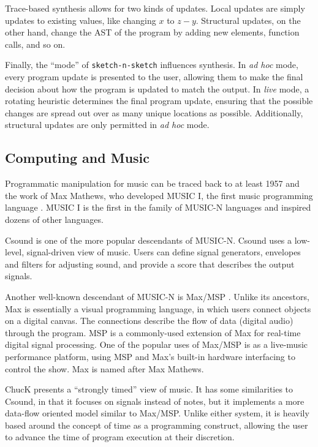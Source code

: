 \documentclass[nocopyrightspace,numbers,10pt]{sigplanconf}
\newcommand{\sketch}{\texttt{sketch-n-sketch}}
\begin{document}
Trace-based synthesis allows for two kinds of updates. Local updates are simply
updates to existing values, like changing $x$ to $z - y$. Structural updates, on
the other hand, change the AST of the program by adding new elements, function
calls, and so on.

Finally, the ``mode'' of \sketch{} influences synthesis. In \emph{ad hoc} mode,
every program update is presented to the user, allowing them to make the final
decision about how the program is updated to match the output. In \emph{live}
mode, a rotating heuristic determines the final program update, ensuring that
the possible changes are spread out over as many unique locations as possible.
Additionally, structural updates are only permitted in \emph{ad hoc} mode.

\subsection{Computing and Music}
\label{sub:background:music}

Programmatic manipulation for music can be traced back to at least 1957 and the
work of Max Mathews, who developed MUSIC I, the first music programming language
\cite{max}. MUSIC I is the first in the family of MUSIC-N languages and
inspired dozens of other languages.

Csound \cite{csound} is one of the more popular descendants of MUSIC-N. Csound
uses a low-level, signal-driven view of music. Users can define signal
generators, envelopes and filters for adjusting sound, and provide a score that
describes the output signals.

Another well-known descendant of MUSIC-N is Max/MSP \cite{maxmsp}. Unlike its
ancestors, Max is essentially a visual programming language, in which users
connect objects on a digital canvas. The connections describe the flow of data
(digital audio) through the program. MSP is a commonly-used extension of Max for
real-time digital signal processing. One of the popular uses of Max/MSP is as a
live-music performance platform, using MSP and Max's built-in hardware
interfacing to control the show. Max is named after Max Mathews.

ChucK \cite{chuck,chuckpaper} presents a ``strongly timed'' view of music. It
has some similarities to Csound, in that it focuses on signals instead of notes,
but it implements a more data-flow oriented model similar to Max/MSP. Unlike
either system, it is heavily based around the concept of time as a programming
construct, allowing the user to advance the time of program execution at their
discretion.
\end{document}
